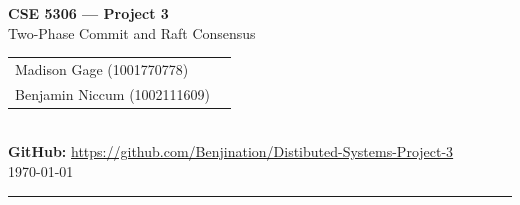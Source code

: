 \documentclass[12pt,letterpaper]{article}
\newcommand{\StudentA}{Madison Gage (1001770778)}
\newcommand{\StudentB}{Benjamin Niccum (1002111609)}
\newcommand{\GithubLink}{https://github.com/Benjination/Distibuted-Systems-Project-3}
\begin{document}
\begin{center}
  {\LARGE \textbf{CSE 5306 — Project 3}}\\[6pt]
  {\large Two-Phase Commit and Raft Consensus}\\[14pt]
  \begin{tabular}{ll}
    \StudentA  \\
    \StudentB  \\
  \end{tabular}\\[8pt]
  \textbf{GitHub:} \href{\GithubLink}{\GithubLink}\\[4pt]
  \today
\end{center}

\vspace{0.5cm}
\hrule
\vspace{0.5cm}

\tableofcontents
\newpage
















\end{document}
